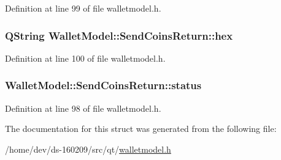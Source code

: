 Definition at line 99 of file walletmodel.\+h.

\hypertarget{struct_wallet_model_1_1_send_coins_return_a532b77588e64f9ed1d12fb1a2f58ce75}{}
\subsubsection[{hex}]{\setlength{\rightskip}{0pt plus 5cm}Q\+String Wallet\+Model\+::\+Send\+Coins\+Return\+::hex}\label{struct_wallet_model_1_1_send_coins_return_a532b77588e64f9ed1d12fb1a2f58ce75}


Definition at line 100 of file walletmodel.\+h.

\hypertarget{struct_wallet_model_1_1_send_coins_return_af7d485f3ae8e2baef7439c53c2adbd35}{}
\subsubsection[{status}]{ Wallet\+Model\+::\+Send\+Coins\+Return\+::status}\label{struct_wallet_model_1_1_send_coins_return_af7d485f3ae8e2baef7439c53c2adbd35}


Definition at line 98 of file walletmodel.\+h.



The documentation for this struct was generated from the following file\+:\begin{DoxyCompactItemize}
\item 
/home/dev/ds-\/160209/src/qt/\hyperlink{walletmodel_8h}{walletmodel.\+h}\end{DoxyCompactItemize}
